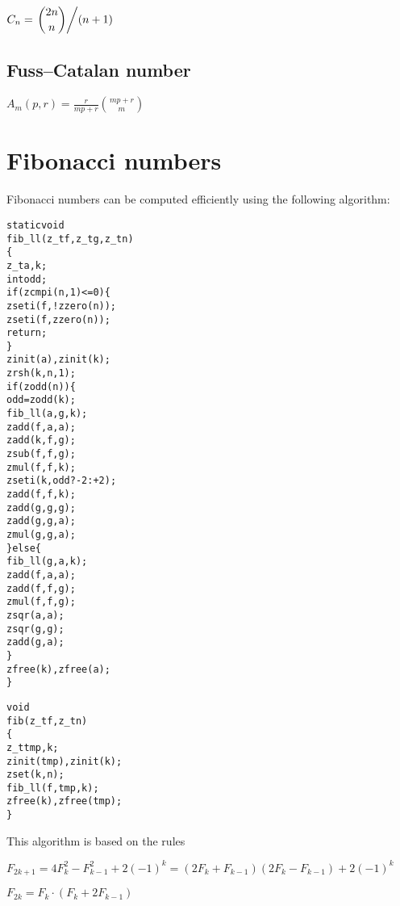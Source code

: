 \( \displaystyle{
    C_n = \left . \binom{2n}{n} \middle / (n + 1) \right .
}\)


\subsection{Fuss–Catalan number}
\label{sec:Fuss-Catalan number} %

\( \displaystyle{
    A_m(p, r) = \frac{r}{mp + r} \binom{mp + r}{m}
}\)


\newpage
\section{Fibonacci numbers}
\label{sec:Fibonacci numbers}

Fibonacci numbers can be computed efficiently
using the following algorithm:

\begin{alltt}
   static void
   fib_ll(z_t f, z_t g, z_t n)
   \{
       z_t a, k;
       int odd;
       if (zcmpi(n, 1) <= 0) \{
           zseti(f, !zzero(n));
           zseti(f, zzero(n));
           return;
       \}
       zinit(a), zinit(k);
       zrsh(k, n, 1);
       if (zodd(n)) \{
           odd = zodd(k);
           fib_ll(a, g, k);
           zadd(f, a, a);
           zadd(k, f, g);
           zsub(f, f, g);
           zmul(f, f, k);
           zseti(k, odd ? -2 : +2);
           zadd(f, f, k);
           zadd(g, g, g);
           zadd(g, g, a);
           zmul(g, g, a);
       \} else \{
           fib_ll(g, a, k);
           zadd(f, a, a);
           zadd(f, f, g);
           zmul(f, f, g);
           zsqr(a, a);
           zsqr(g, g);
           zadd(g, a);
       \}
       zfree(k), zfree(a);
   \}
\end{alltt}

\newpage
\begin{alltt}
   void
   fib(z_t f, z_t n)
   \{
       z_t tmp, k;
       zinit(tmp), zinit(k);
       zset(k, n);
       fib_ll(f, tmp, k);
       zfree(k), zfree(tmp);
   \}
\end{alltt}

\noindent
This algorithm is based on the rules

\vspace{1em}
\( \displaystyle{
    F_{2k + 1} = 4F_k^2 - F_{k - 1}^2 + 2(-1)^k = (2F_k + F_{k-1})(2F_k - F_{k-1}) + 2(-1)^k
}\)
\vspace{1em}

\( \displaystyle{
    F_{2k} = F_k \cdot (F_k + 2F_{k - 1})
}\)
\vspace{1em}

